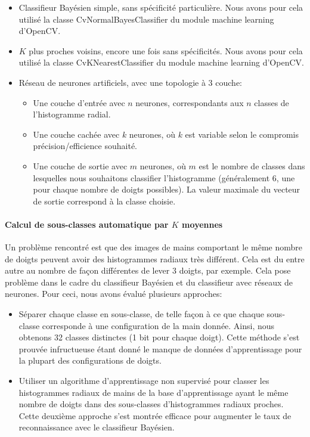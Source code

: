 \begin{itemize}
\item Classifieur Bayésien simple, sans spécificité particulière. Nous avons pour cela utilisé la classe CvNormalBayesClassifier du module machine learning d'OpenCV.
\item $K$ plus proches voisins, encore une fois sans spécificités. Nous avons pour cela utilisé la classe CvKNearestClassifier du module machine learning d'OpenCV.
\item Réseau de neurones artificiels, avec une topologie à $3$ couche:

\begin{itemize}
\item Une couche d'entrée avec $n$ neurones, correspondants aux $n$ classes de l'histogramme radial.
\item Une couche cachée avec $k$ neurones, où $k$ est variable selon le compromis précision/efficience souhaité.
\item Une couche de sortie avec $m$ neurones, où $m$ est le nombre de classes dans lesquelles nous souhaitons classifier l'histogramme (généralement 6, une pour chaque nombre de doigts possibles). La valeur maximale du vecteur de sortie correspond à la classe choisie.
\end{itemize}
\end{itemize}

\paragraph{Calcul de sous-classes automatique par $K$ moyennes}
Un problème rencontré est que des images de mains comportant le même nombre de doigts peuvent avoir des histogrammes radiaux très différent. Cela est du entre autre au nombre de façon différentes de lever 3 doigts, par exemple. Cela pose problème dans le cadre du classifieur Bayésien et du classifieur avec réseaux de neurones. Pour ceci, nous avons évalué plusieurs approches:

\begin{itemize}
\item Séparer chaque classe en sous-classe, de telle façon à ce que chaque sous-classe corresponde à une configuration de la main donnée. Ainsi, nous obtenons 32 classes distinctes (1 bit pour chaque doigt). Cette méthode s'est prouvée infructueuse étant donné le manque de données d'apprentissage pour la plupart des configurations de doigts.
\item Utiliser un algorithme d'apprentissage non supervisé pour classer les histogrammes radiaux de mains de la base d'apprentissage ayant le même nombre de doigts dans des sous-classes d'histogrammes radiaux proches. Cette deuxième approche s'est montrée efficace pour augmenter le taux de reconnaissance avec le classifieur Bayésien.
\end{itemize}

